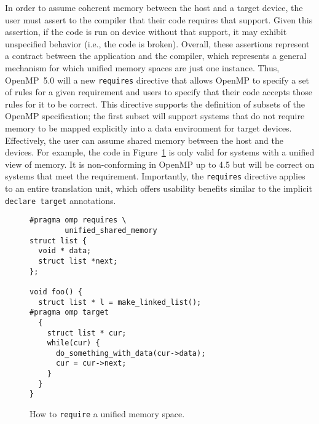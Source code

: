 In order to assume coherent memory between the host and a target device, 
the user must assert to the compiler that their code requires that support.
Given this assertion, if the code is run on device without that support, 
it may exhibit unspecified behavior (i.e., the code is broken). Overall,
these assertions represent a contract between the application and the 
compiler, which represents a general mechanism for which unified memory
spaces are just one instance. Thus, OpenMP~5.0 will a new \texttt{requires} 
directive that allows OpenMP to specify a set of rules for a given 
requirement and users to specify that their code accepts those rules for
it to be correct. This directive supports the definition of subsets of 
the OpenMP specification; the first subset will support systems that do 
not require memory to be mapped explicitly into a data environment for 
target devices. Effectively, the user can assume shared memory between
the host and the devices. For example, the code in Figure~\ref{fig:unified} 
is only valid for systems with a unified view of memory. It is non-conforming 
in OpenMP up to 4.5 but will be correct on systems that meet the requirement.
Importantly, the \texttt{requires} directive applies to an entire translation
unit, which offers usability benefits similar to the implicit 
\texttt{declare target} annotations.

\begin{figure}
\begin{verbatim}
#pragma omp requires \
        unified_shared_memory
struct list {
  void * data;
  struct list *next;
};

void foo() {
  struct list * l = make_linked_list();
#pragma omp target
  {
    struct list * cur;
    while(cur) {
      do_something_with_data(cur->data);
      cur = cur->next;
    }
  }
}
\end{verbatim}
\caption{How to \texttt{require} a unified memory space.\label{fig:unified}}
\end{figure}

